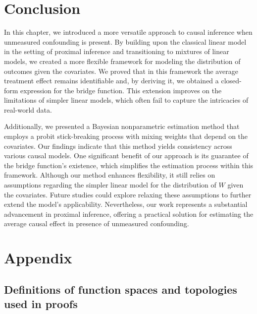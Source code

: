\section{Conclusion}
  
In this chapter, we introduced a more versatile approach to causal inference when unmeasured confounding is present. By building upon the classical linear model in the setting of proximal inference and transitioning to mixtures of linear models, we created a more flexible framework for modeling the distribution of outcomes given the covariates. We proved that in this framework the average treatment effect remains identifiable and, by deriving it, we obtained a closed-form expression for the bridge function. This extension improves on the limitations of simpler linear models, which often fail to capture the intricacies of real-world data.

Additionally, we presented a Bayesian nonparametric estimation method that employs a probit stick-breaking process with mixing weights that depend on the covariates. Our findings indicate that this method yields consistency across various causal models. One significant benefit of our approach is its guarantee of the bridge function's existence, which simplifies the estimation process within this framework. Although our method enhances flexibility, it still relies on assumptions regarding the simpler linear model for the distribution of $W$ given the covariates. Future studies could explore relaxing these assumptions to further extend the model's applicability. Nevertheless, our work represents a substantial advancement in proximal inference, offering a practical solution for estimating the average causal effect in presence of unmeasured confounding.




\section{Appendix}\label{sec: appendix chapter5}

\subsection{Definitions of function spaces and topologies used in proofs}

